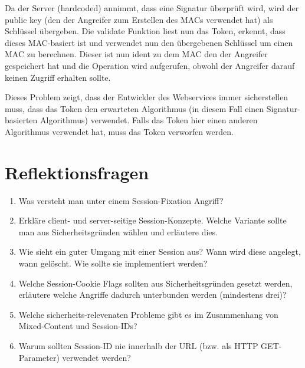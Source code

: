 Da der Server (hardcoded) annimmt, dass eine Signatur überprüft wird, wird der public key (den der Angreifer zum Erstellen des MACs verwendet hat) als Schlüssel übergeben. Die validate Funktion liest nun das Token, erkennt, dass dieses MAC-basiert ist und verwendet nun den übergebenen Schlüssel um einen MAC zu berechnen. Dieser ist nun ident zu dem MAC den der Angreifer gespeichert hat und die Operation wird aufgerufen, obwohl der Angreifer darauf keinen Zugriff erhalten sollte.

Dieses Problem zeigt, dass der Entwickler des Webservices immer sicherstellen muss, dass das Token den erwarteten Algorithmus (in diesem Fall einen Signatur-basierten Algorithmus) verwendet. Falls das Token hier einen anderen Algorithmus verwendet hat, muss das Token verworfen werden.


\section{Reflektionsfragen}

\begin{enumerate}
	\item Was versteht man unter einem Session-Fixation Angriff?
	\item Erkläre client- und server-seitige Session-Konzepte. Welche Variante sollte man aus Sicherheitsgründen wählen und erläutere dies.
	\item Wie sieht ein guter Umgang mit einer Session aus? Wann wird diese angelegt, wann gelöscht. Wie sollte sie implementiert werden?
	\item Welche Session-Cookie Flags sollten aus Sicherheitsgründen gesetzt werden, erläutere welche Angriffe dadurch unterbunden werden (mindestens drei)?
	\item Welche sicherheits-relevenaten Probleme gibt es im Zusammenhang von Mixed-Content und Session-IDs?
	\item Warum sollten Session-ID nie innerhalb der URL (bzw. als HTTP GET-Parameter) verwendet werden?
\end{enumerate}
